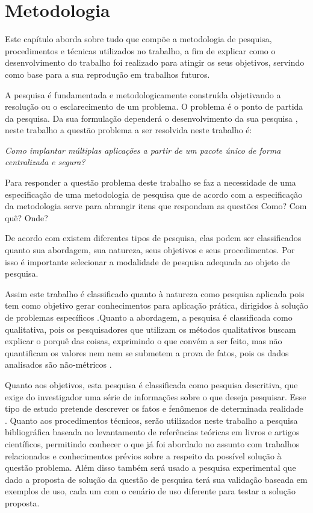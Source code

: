 \chapter{Metodologia}
\label{cap-metodologia}
Este capítulo aborda sobre tudo que compõe a metodologia de pesquisa,
procedimentos e técnicas utilizados no trabalho, a fim de
explicar como o desenvolvimento do trabalho foi realizado para atingir os seus objetivos,
servindo como base para a sua reprodução em trabalhos futuros.

A pesquisa é fundamentada e metodologicamente construída objetivando a resolução
ou o esclarecimento de um problema. O problema é o ponto de partida da pesquisa.
Da sua formulação dependerá o desenvolvimento da sua pesquisa
\cite{moresi2003metodologia}, neste trabalho a questão problema a ser resolvida neste trabalho é:

\begin{center}
  \textit{
  Como implantar múltiplas aplicações a partir de um pacote único
  de forma centralizada e segura?
}
\end{center}

Para responder a questão problema deste trabalho se faz a necessidade de uma especificação
de uma metodologia de pesquisa que de acordo com \cite{marconi2002tecnicas} a
especificação da metodologia serve para abrangir itens que respondam as questões
Como? Com quê? Onde?

De acordo com \cite{gerhardt2009metodos} existem diferentes tipos de pesquisa,
elas podem ser classificados quanto sua abordagem, sua natureza, seus objetivos e
seus procedimentos. Por isso é importante selecionar a modalidade de pesquisa
adequada ao objeto de pesquisa.

Assim este trabalho é classificado quanto à natureza como pesquisa aplicada
pois tem como objetivo gerar conhecimentos para aplicação prática, dirigidos à
solução de problemas específicos \cite{gerhardt2009metodos}.Quanto a abordagem,
a pesquisa é classificada como qualitativa, pois os pesquisadores que utilizam os
métodos qualitativos buscam explicar o porquê das coisas, exprimindo o que convém
a ser feito, mas não quantificam os valores nem nem se submetem a prova de fatos,
pois os dados analisados são não-métricos \cite{gerhardt2009metodos}.

Quanto aos objetivos, esta pesquisa é classificada como pesquisa descritiva, que
exige do investigador uma série de informações sobre o que deseja pesquisar.
Esse tipo de estudo pretende descrever os fatos e fenômenos de determinada realidade
\cite{trivinos1987introduccao}. Quanto aos procedimentos técnicos, serão utilizados
neste trabalho a pesquisa bibliográfica baseada no levantamento de referências
teóricas em livros e artigos científicos, permitindo conhecer o que já foi abordado
no assunto com trabalhos relacionados e conhecimentos prévios sobre a respeito da
possível solução à questão problema. Além disso também será usado a pesquisa
experimental que dado a proposta de solução da questão de pesquisa terá sua
validação baseada em exemplos de uso, cada um com o cenário de uso diferente para
testar a solução proposta.

